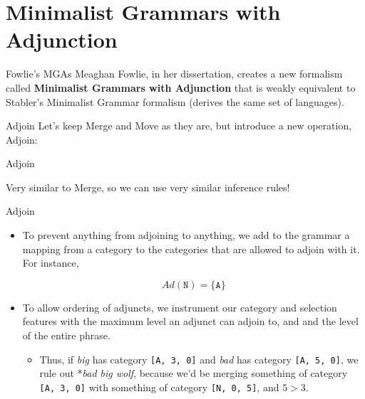 \documentclass{beamer}
\begin{document}
\section{Minimalist Grammars with Adjunction}

\begin{frame}{Fowlie's MGAs}
  Meaghan Fowlie, in her dissertation, creates a new formalism called
  \textbf{Minimalist Grammars with Adjunction} that is weakly
  equivalent to Stabler's Minimalist Grammar formalism (derives the
  same set of languages).
\end{frame}

\begin{frame}{Adjoin}
  Let's keep Merge and Move as they are, but introduce a new
  operation, Adjoin:

  \begin{block}{Adjoin}
    \begin{center}
      \end{center}
  \end{block}

  Very similar to Merge, so we can use very similar inference rules!
\end{frame}

\begin{frame}{Adjoin}
  \begin{itemize}
  \item To prevent anything from adjoining to anything, we add to the
    grammar a mapping from a category to the categories that are
    allowed to adjoin with it.  For instance,

    \[
      Ad(\mathtt{N}) = \{ \mathtt{A} \}
    \]
  \item To allow ordering of adjuncts, we instrument our category and
    selection features with the maximum level an adjunct can adjoin
    to, and and the level of the entire phrase.
    \begin{itemize}
    \item Thus, if \textit{big} has category \texttt{[A, 3, 0]} and
      \textit{bad} has category \texttt{[A, 5, 0]}, we rule out
      *\textit{bad big wolf}, because we'd be merging something of
      category \texttt{[A, 3, 0]} with something of category
      \texttt{[N, 0, 5]}, and $5 > 3$.
    \end{itemize}
  \end{itemize}
\end{frame}
\end{document}
